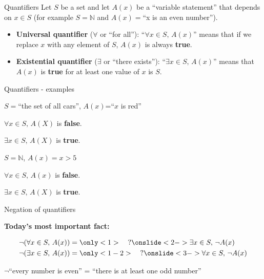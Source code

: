 \documentclass[11pt]{beamer}
\theoremstyle{definition}
\begin{document}
\begin{frame}{Quantifiers}
  Let $S$ be a set and let $A(x)$ be a ``variable statement'' that depends on
  $x\in S$ (for example $S=\mathbb{N}$ and $A(x)=$``x is an even number'').
  \pause

  \begin{itemize}
    \item \textbf{Universal quantifier} ($\forall$ or ``for all''):
          ``$\forall x\in S,\,A(x)$'' means that if we replace $x$ with any
          element of $S$, $A(x)$ is always \textbf{true}.
    \item \textbf{Existential quantifier} ($\exists$ or ``there exists''):
          ``$\exists x\in S,\, A(x)$'' means that $A(x)$ is \textbf{true} for
          at least one value of $x$ is $S$.
  \end{itemize}
\end{frame}

\begin{frame}{Quantifiers - examples}
  \begin{example}
  $S=$``the set of all cars'', $A(x)$=``$x$ is red''

  $\forall x\in S,\, A(X)$ is \textbf{false}.

  $\exists x\in S,\, A(X)$ is \textbf{true}.
  \end{example}
  \begin{example}
    $S=\mathbb{N}$, $A(x)=x>5$

  $\forall x\in S,\, A(x)$ is \textbf{false}.

  $\exists x\in S,\, A(X)$ is \textbf{true}.
  \end{example}
\end{frame}

\begin{frame}{Negation of quantifiers}
  \begin{center}
    \textbf{Today's most important fact:}
  \end{center}
  \begin{align*}
    \neg(\forall x\in S,\, A(x))&=\only<1>{\quad?}
    \onslide<2->{\exists x\in S,\,\neg A(x)}\\
    \neg(\exists x\in S,\, A(x))&=\only<1-2>{\quad?}
    \onslide<3->{\forall x\in S,\,\neg A(x)}\\
  \end{align*}
  \pause
  \begin{example}
    \begin{center}
  $\neg$``every number is even'' = ``there is at least one odd number''
    \end{center}
  \end{example}
\end{frame}
\end{document}
